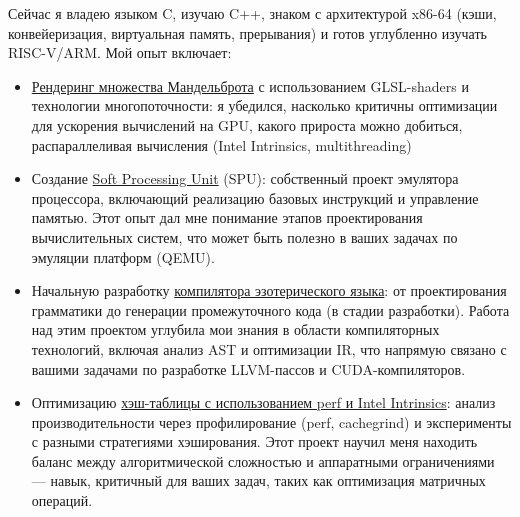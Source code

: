 \documentclass[11pt]{report}
\begin{document}
\begin{titlepage}
\begin{large}
\vspace{0.7em}

Сейчас я владею языком C, изучаю C++, знаком с архитектурой x86-64 (кэши, конвейеризация, виртуальная память, прерывания) и готов углубленно изучать RISC-V/ARM. Мой опыт включает:

\begin{itemize}
    \item \href{github.com/lvbealr/MandelbrotSet}{Рендеринг множества Мандельброта} с использованием GLSL-shaders и технологии многопоточности: я убедился, насколько критичны оптимизации для ускорения вычислений на GPU, какого прироста можно добиться, распараллеливая вычисления (Intel Intrinsics, multithreading)

    \item Создание \href{github.com/lvbealr/SPU}{Soft Processing Unit} (SPU): собственный проект эмулятора процессора, включающий реализацию базовых инструкций и управление памятью. Этот опыт дал мне понимание этапов проектирования вычислительных систем, что может быть полезно в ваших задачах по эмуляции платформ (QEMU).

    \item Начальную разработку \href{github.com/lvbealr/Language}{компилятора эзотерического языка}: от проектирования грамматики до генерации промежуточного кода (в стадии разработки). Работа над этим проектом углубила мои знания в области компиляторных технологий, включая анализ AST и оптимизации IR, что напрямую связано с вашими задачами по разработке LLVM-пассов и CUDA-компиляторов.

    \item Оптимизацию \href{github.com/lvbealr/HashTable}{хэш-таблицы с использованием perf и Intel Intrinsics}: анализ производительности через профилирование (perf, cachegrind) и эксперименты с разными стратегиями хэширования. Этот проект научил меня находить баланс между алгоритмической сложностью и аппаратными ограничениями — навык, критичный для ваших задач, таких как оптимизация матричных операций.

\end{itemize}

\newpage



\end{large}
\end{titlepage}
\end{document}
